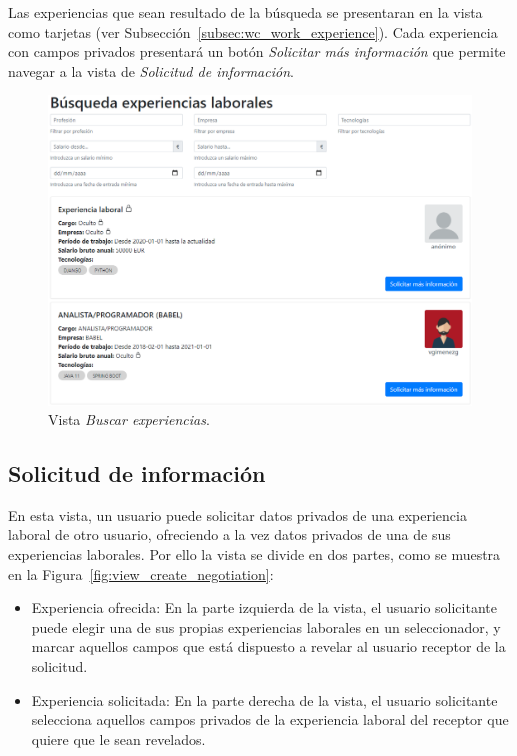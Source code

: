\documentclass[a4paper, 12pt]{book}
\begin{document}
    Las experiencias que sean resultado de la búsqueda se presentaran en la vista como tarjetas (ver Subsección~\ref{subsec:wc_work_experience}).
    Cada experiencia con campos privados presentará un botón \emph{Solicitar más información} que permite navegar a la vista de \emph{Solicitud de información}.


    \begin{figure}
        \centering
        \includegraphics[width=15cm, keepaspectratio]{img/search_we.PNG}
        \caption{Vista \emph{Buscar experiencias}.}\label{fig:view_search_work_experiences}
    \end{figure}

    \subsection{Solicitud de información}
    \label{subsec:view_create_negotiation}
    En esta vista, un usuario puede solicitar datos privados de una experiencia laboral de otro usuario, ofreciendo a la vez datos privados de una de sus experiencias laborales.
    Por ello la vista se divide en dos partes, como se muestra en la Figura~\ref{fig:view_create_negotiation}:

    \begin{itemize}
        \item Experiencia ofrecida: En la parte izquierda de la vista, el usuario solicitante puede elegir una de sus propias experiencias laborales en un seleccionador,
        y marcar aquellos campos que está dispuesto a revelar al usuario receptor de la solicitud.
        \item Experiencia solicitada: En la parte derecha de la vista, el usuario solicitante selecciona aquellos campos privados de la experiencia laboral del receptor que quiere que le sean revelados.
    \end{itemize}
\end{document}
